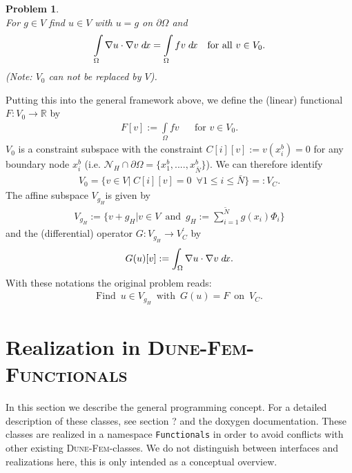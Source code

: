 \documentclass[a4paper,11pt]{article}
\numberwithin{equation}{section}
\newtheorem{problem}[definition]{Problem}
\newcommand{\theoremNewline}{\hspace{1mm}\\}
\newcommand{\Code}[1]{\texttt{#1}}
\newcommand{\dunefem}{\textsc{Dune-Fem}\xspace}
\newcommand{\dunefemfunctionals}{\textsc{Dune-Fem-Functionals}\xspace}
\newcommand{\hnS}{\hspace{-1.25pt}}
\newcommand{\dx}{\;d\hnS x}
\newcommand{\R}{\mathbb{R}}
\begin{document}
      \begin{problem}\theoremNewline
      For $g \in V$ find $u \in V$ with $u=g$ on $\partial \Omega$ and
      \begin{align*}
      \int\limits_{\Omega} \nabla u \cdot \nabla v \dx = \int\limits_{\Omega} f v \dx &&\text{for all }v \in V_0.
      \end{align*}
      (Note: $V_0$ can not be replaced by $V$).
      \end{problem}

      Putting this into the general framework above, we define the (linear) functional
      ${F: V_0 \rightarrow \R}$ by
      \begin{align*}
        F[v] := \int\limits_{\Omega} f v &&\text{for } v \in V_0.
      \end{align*}
      $V_0$ is a constraint subspace with the constraint $C[i][v] := v(x_i^b) = 0$ for any boundary node
      $x_i^b$ (i.e. $\mathcal{N}_H \cap \partial \Omega = \{ x_1^b, ...., x_{\bar{N}}^b\}$). We can therefore identify
      \begin{align*}
        V_0 = \{ v \in V| \hspace{3pt} C[i][v] = 0 \enspace \forall 1\le i\le \bar{N} \} =: V_C.
      \end{align*}
      The affine subspace $V_{g_H}$is given by
      \begin{align*}
        V_{g_H} :=
          \Big\{
            v + g_H
          \Big|
            v \in V \enspace \mbox{and} \enspace g_H := \sum_{i=1}^{\tilde{N}} g(x_i) \Phi_i
          \Big\}
      \end{align*}
      and the (differential) operator $G : V_{g_H} \rightarrow V_C^{\prime}$ by
      \begin{align*}
      G(u)[v] := \int_{\Omega} \nabla u \cdot \nabla v \dx.
      \end{align*}
      With these notations the original problem reads:
      \begin{align*}
      \text{Find} \enspace u \in V_{g_H} \enspace \mbox{with} \enspace G(u) = F \enspace \mbox{on} \enspace V_C.
      \end{align*}

  \section{Realization in \dunefemfunctionals}
    \label{realization_in_dune_fem_dunctionals}

    In this section we describe the general programming concept. For a detailed description of these classes, see
    section ? and the doxygen documentation. These classes are realized in a namespace \Code{Functionals} in order to
    avoid conflicts with other existing \dunefem-classes. We do not distinguish between interfaces and realizations
    here, this is only intended as a conceptual overview.
\end{document}
